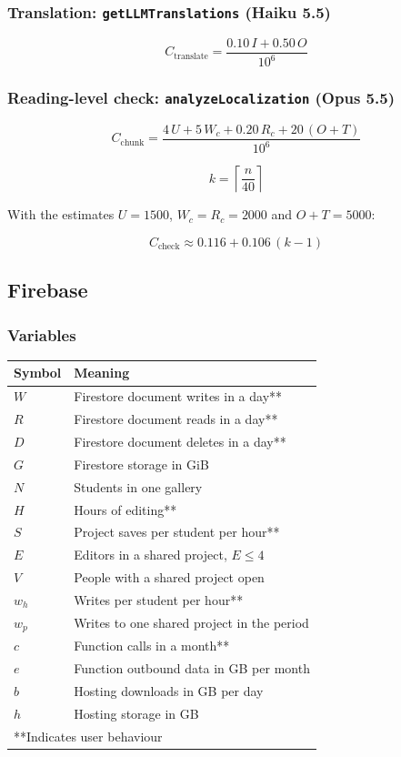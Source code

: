 \documentclass{article}
\begin{document}
\subsubsection{Translation: \texttt{getLLMTranslations} (Haiku 5.5)}

\[
C_{\text{translate}} = \frac{0.10\,I + 0.50\,O}{10^{6}}
\]

\subsubsection{Reading-level check: \texttt{analyzeLocalization} (Opus 5.5)}

\[
C_{\text{chunk}} =
\frac{4\,U + 5\,W_c + 0.20\,R_c + 20\,(O + T)}{10^{6}}
\]

\[
k = \left\lceil \frac{n}{40} \right\rceil
\]

With the estimates $U = 1500$, $W_c = R_c = 2000$ and $O + T = 5000$:

\[
C_{\text{check}} \approx 0.116 + 0.106\,(k - 1)
\]

\subsection{Firebase}

\subsubsection{Variables}

\begin{center}
\begin{tabular}{ll}
\toprule
Symbol & Meaning \\
\midrule
$W$ & Firestore document writes in a day** \\
$R$ & Firestore document reads in a day** \\
$D$ & Firestore document deletes in a day** \\
$G$ & Firestore storage in GiB \\
$N$ & Students in one gallery \\
$H$ & Hours of editing** \\
$S$ & Project saves per student per hour** \\
$E$ & Editors in a shared project, $E \le 4$ \\
$V$ & People with a shared project open \\
$w_h$ & Writes per student per hour** \\
$w_p$ & Writes to one shared project in the period \\
$c$ & Function calls in a month** \\
$e$ & Function outbound data in GB per month \\
$b$ & Hosting downloads in GB per day \\
$h$ & Hosting storage in GB \\
\multicolumn{2}{l}{**Indicates user behaviour} \\
\bottomrule
\end{tabular}
\end{center}
\end{document}
